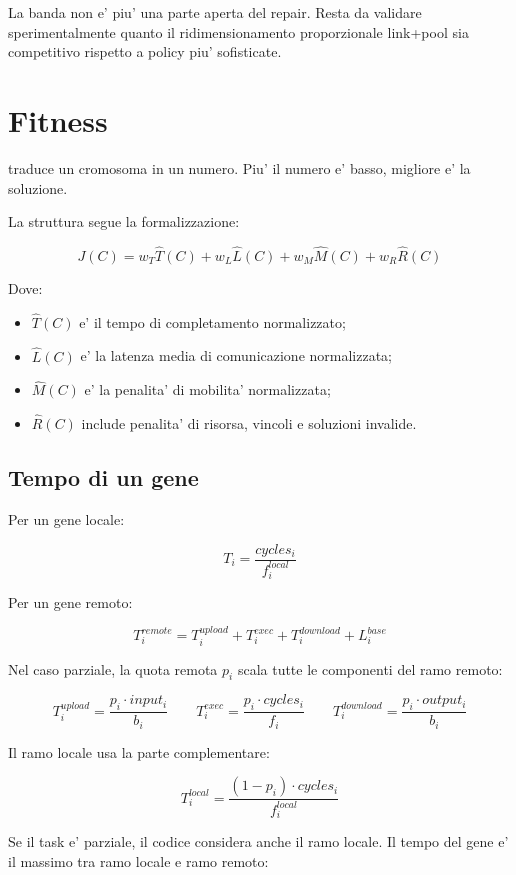 \documentclass[11pt,a4paper]{article}
\newcommand{\code}[1]{\texttt{\detokenize{#1}}}
\newcommand{\cls}[1]{\code{#1}}
\begin{document}
La banda non e' piu' una parte aperta del repair. Resta da validare
sperimentalmente quanto il ridimensionamento proporzionale link+pool sia
competitivo rispetto a policy piu' sofisticate.

\section{Fitness}

\cls{FitnessEvaluator} traduce un cromosoma in un numero. Piu' il numero e'
basso, migliore e' la soluzione.

La struttura segue la formalizzazione:

\[
J(C) =
w_T \hat{T}(C) +
w_L \hat{L}(C) +
w_M \hat{M}(C) +
w_R \hat{R}(C)
\]

Dove:

\begin{itemize}[leftmargin=*,nosep]
    \item $\hat{T}(C)$ e' il tempo di completamento normalizzato;
    \item $\hat{L}(C)$ e' la latenza media di comunicazione normalizzata;
    \item $\hat{M}(C)$ e' la penalita' di mobilita' normalizzata;
    \item $\hat{R}(C)$ include penalita' di risorsa, vincoli e soluzioni invalide.
\end{itemize}

\subsection{Tempo di un gene}

Per un gene locale:

\[
T_i = \frac{cycles_i}{f_i^{local}}
\]

Per un gene remoto:

\[
T_i^{remote} =
T_i^{upload} + T_i^{exec} + T_i^{download} + L_i^{base}
\]

Nel caso parziale, la quota remota $p_i$ scala tutte le componenti del ramo
remoto:

\[
T_i^{upload} = \frac{p_i \cdot input_i}{b_i}
\qquad
T_i^{exec} = \frac{p_i \cdot cycles_i}{f_i}
\qquad
T_i^{download} = \frac{p_i \cdot output_i}{b_i}
\]

Il ramo locale usa la parte complementare:

\[
T_i^{local} = \frac{(1-p_i)\cdot cycles_i}{f_i^{local}}
\]

Se il task e' parziale, il codice considera anche il ramo locale. Il tempo del
gene e' il massimo tra ramo locale e ramo remoto:
\end{document}
